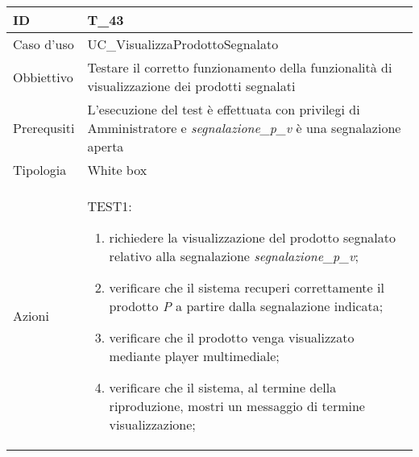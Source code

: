 \begin{table}[hb]
    \centering
    \begin{tabular}{ |p{2cm}|p{10cm}|  }
        \hline
        ID          & T\_43                                                                              \\\hline
        Caso d'uso  & UC\_VisualizzaProdottoSegnalato                                                           \\\hline
        Obbiettivo  & Testare il corretto funzionamento della funzionalità di visualizzazione dei prodotti segnalati \\\hline
        Prerequsiti & L'esecuzione del test è effettuata con privilegi di Amministratore e \emph{segnalazione\_p\_v} è una segnalazione aperta                         \\\hline
        Tipologia   & White box                                                                          \\\hline
        Azioni      &
        TEST1:
        \begin{enumerate}[nosep, topsep=0pt]
            \item richiedere la visualizzazione del prodotto segnalato relativo alla segnalazione \emph{segnalazione\_p\_v};
            \item verificare che il sistema recuperi correttamente il prodotto \emph{P} a partire dalla segnalazione indicata;
            \item verificare che il prodotto venga visualizzato mediante player multimediale;
            \item verificare che il sistema, al termine della riproduzione, mostri un messaggio di termine visualizzazione;
        \end{enumerate}
        \\\hline
    \end{tabular}
\end{table}

